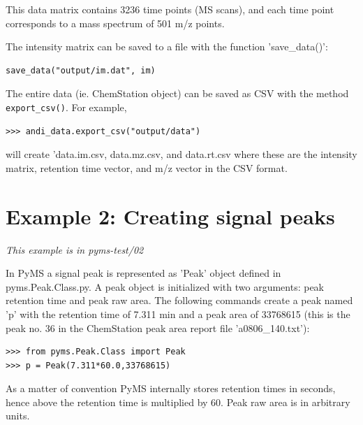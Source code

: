 \noindent
This data matrix contains 3236 time points (MS scans), and each time point
corresponds to a mass spectrum of 501 m/z points.

The intensity matrix can be saved to a file with the function 'save\_data()':

\begin{verbatim}
save_data("output/im.dat", im)
\end{verbatim}

The entire data (ie. ChemStation object) can be saved as CSV with the method
{\tt export\_csv()}. For example,

\begin{verbatim}
>>> andi_data.export_csv("output/data")
\end{verbatim}

\noindent
will create 'data.im.csv, data.mz.csv, and data.rt.csv where these are the
intensity matrix, retention time vector, and m/z vector in the CSV format.

\section{Example 2: Creating signal peaks}

\noindent
{\em This example is in pyms-test/02}

In PyMS a signal peak is represented as 'Peak' object defined in
pyms.Peak.Class.py. A peak object is initialized with two arguments:
peak retention time and peak raw area. The following commands create
a peak named 'p' with the retention time of 7.311 min and a peak area
of 33768615 (this is the peak no. 36 in the ChemStation peak area report
file 'a0806\_140.txt'):

\begin{verbatim}
>>> from pyms.Peak.Class import Peak
>>> p = Peak(7.311*60.0,33768615)
\end{verbatim}

\noindent
As a matter of convention PyMS internally stores retention times in seconds,
hence above the retention time is multiplied by 60. Peak raw area is in
arbitrary units.

